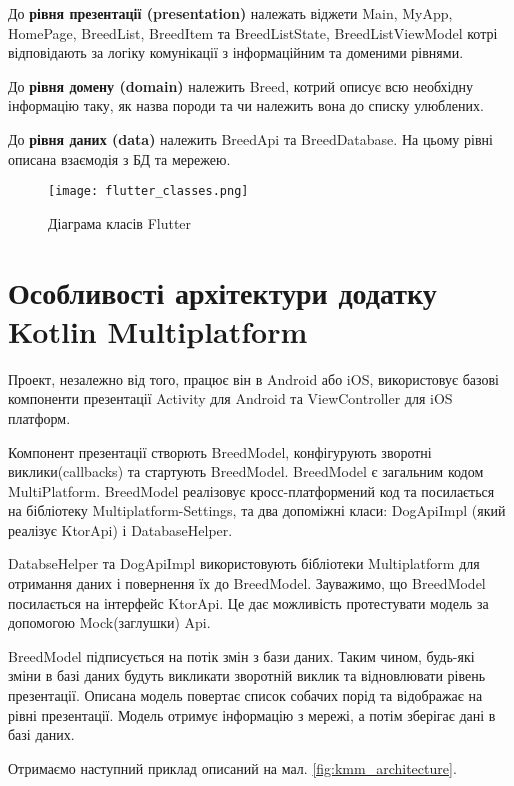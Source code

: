 До \textbf{рівня презентації (presentation)} належать віджети Main, MyApp, HomePage, BreedList, BreedItem та
BreedListState, BreedListViewModel котрі відповідають за логіку комунікації з інформаційним та доменими рівнями.

До \textbf{рівня домену (domain)} належить Breed, котрий описує всю необхідну інформацію таку, як назва породи та чи
належить вона до списку улюблених.

До \textbf{рівня даних (data)} належить BreedApi та BreedDatabase. На цьому рівні описана взаємодія з БД та мережею.

\begin{figure}
    \begin{center}
        \texttt{[image: flutter\_classes.png]}
        \caption{Діаграма класів Flutter}
        \label{fig:flutter_classes}
    \end{center}
\end{figure}


\section{Особливості архітектури додатку Kotlin Multiplatform}
\label{sec:kmm_architecture}

Проект, незалежно від того, працює він в Android або iOS, використовує базові компоненти презентації
Activity для Android та ViewController для iOS платформ.

Компонент презентації створють BreedModel, конфігурують зворотні виклики(callbacks) та стартують BreedModel.
BreedModel є загальним кодом MultiPlatform.
BreedModel реалізовує кросс-платформений код та посилається на бібліотеку Multiplatform-Settings,
та два допоміжні класи: DogApiImpl (який реалізує KtorApi) і DatabaseHelper.

DatabseHelper та DogApiImpl використовують бібліотеки Multiplatform для отримання даних і повернення їх до BreedModel.
Зауважимо, що BreedModel посилається на інтерфейс KtorApi. Це дає можливість протестувати модель за допомогою Mock(заглушки) Api.

BreedModel підписується на потік змін з бази даних. Таким чином, будь-які зміни в базі даних будуть викликати
зворотній виклик та відновлювати рівень презентації.
Описана модель повертає список собачих порід та відображає на рівні презентації.
Модель отримує інформацію з мережі, а потім зберігає дані в базі даних.

Отримаємо наступний приклад описаний на мал. \ref{fig:kmm_architecture}.

